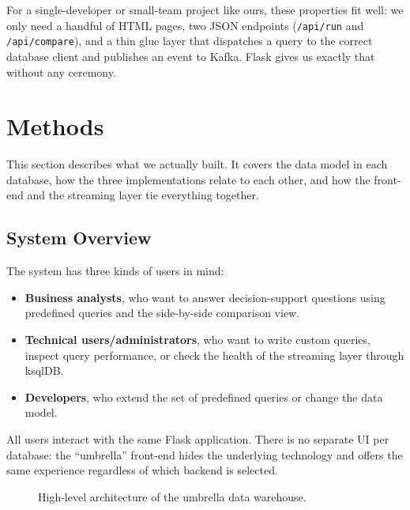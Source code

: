 \documentclass[11pt,a4paper]{article}
\begin{document}
For a single-developer or small-team project like ours, these properties
fit well: we only need a handful of HTML pages, two JSON endpoints
(\texttt{/api/run} and \texttt{/api/compare}), and a thin glue layer that
dispatches a query to the correct database client and publishes an event
to Kafka. Flask gives us exactly that without any ceremony.

\section{Methods}\label{sec:methods}

This section describes what we actually built. It covers the data model in
each database, how the three implementations relate to each other, and how
the front-end and the streaming layer tie everything together.

\subsection{System Overview}

The system has three kinds of users in mind:

\begin{itemize}[leftmargin=*]
    \item \textbf{Business analysts}, who want to answer decision-support
          questions using predefined queries and the side-by-side comparison
          view.
    \item \textbf{Technical users/administrators}, who want to write custom
          queries, inspect query performance, or check the health of the
          streaming layer through ksqlDB.
    \item \textbf{Developers}, who extend the set of predefined queries or
          change the data model.
\end{itemize}

All users interact with the same Flask application. There is no separate UI
per database: the ``umbrella'' front-end hides the underlying technology and
offers the same experience regardless of which backend is selected.

\begin{figure}[H]
\centering
\caption{High-level architecture of the umbrella data warehouse.}
\label{fig:architecture}
\end{figure}
\end{document}
